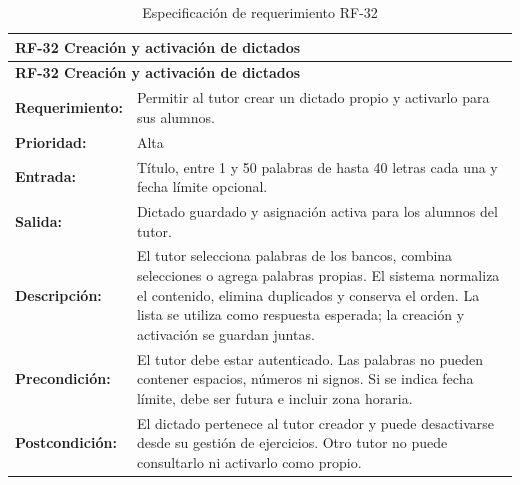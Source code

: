 \begin{longtable}{|p{3.2cm}|p{11.8cm}|}
\caption{Especificación de requerimiento RF-32}\label{tab:rf32} \\ \hline
\multicolumn{2}{|p{15cm}|}{\textbf{RF-32 Creación y activación de dictados}} \\ \hline
\endfirsthead
\hline
\multicolumn{2}{|p{15cm}|}{\textbf{RF-32 Creación y activación de dictados}} \\ \hline
\endhead
\textbf{Requerimiento:} & Permitir al tutor crear un dictado propio y activarlo para sus alumnos. \\ \hline
\textbf{Prioridad:} & Alta \\ \hline
\textbf{Entrada:} & Título, entre 1 y 50 palabras de hasta 40 letras cada una y fecha límite opcional. \\ \hline
\textbf{Salida:} & Dictado guardado y asignación activa para los alumnos del tutor. \\ \hline
\textbf{Descripción:} & El tutor selecciona palabras de los bancos, combina selecciones o agrega palabras propias. El sistema normaliza el contenido, elimina duplicados y conserva el orden. La lista se utiliza como respuesta esperada; la creación y activación se guardan juntas. \\ \hline
\textbf{Precondición:} & El tutor debe estar autenticado. Las palabras no pueden contener espacios, números ni signos. Si se indica fecha límite, debe ser futura e incluir zona horaria. \\ \hline
\textbf{Postcondición:} & El dictado pertenece al tutor creador y puede desactivarse desde su gestión de ejercicios. Otro tutor no puede consultarlo ni activarlo como propio. \\ \hline
\end{longtable}

